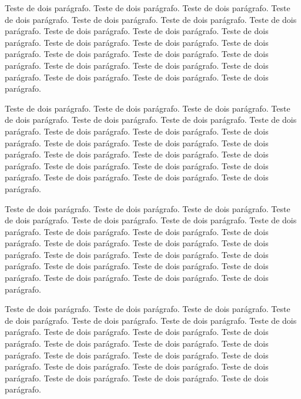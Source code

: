 \documentclass[12pt]{article}
\begin{document}

Teste de dois parágrafo. Teste de dois parágrafo. Teste de dois parágrafo. Teste de dois parágrafo. Teste de dois parágrafo. Teste de dois parágrafo. Teste de dois parágrafo. Teste de dois parágrafo. Teste de dois parágrafo. Teste de dois parágrafo. Teste de dois parágrafo. Teste de dois parágrafo. Teste de dois parágrafo. Teste de dois parágrafo. Teste de dois parágrafo. Teste de dois parágrafo. Teste de dois parágrafo. Teste de dois parágrafo. Teste de dois parágrafo. Teste de dois parágrafo. Teste de dois parágrafo. Teste de dois parágrafo.

Teste de dois parágrafo. Teste de dois parágrafo. Teste de dois parágrafo. Teste de dois parágrafo. Teste de dois parágrafo. Teste de dois parágrafo. Teste de dois parágrafo. Teste de dois parágrafo. Teste de dois parágrafo. Teste de dois parágrafo. Teste de dois parágrafo. Teste de dois parágrafo. Teste de dois parágrafo. Teste de dois parágrafo. Teste de dois parágrafo. Teste de dois parágrafo. Teste de dois parágrafo. Teste de dois parágrafo. Teste de dois parágrafo. Teste de dois parágrafo. Teste de dois parágrafo. Teste de dois parágrafo.


Teste de dois parágrafo. Teste de dois parágrafo. Teste de dois parágrafo. Teste de dois parágrafo. Teste de dois parágrafo. Teste de dois parágrafo. Teste de dois parágrafo. Teste de dois parágrafo. Teste de dois parágrafo. Teste de dois parágrafo. Teste de dois parágrafo. Teste de dois parágrafo. Teste de dois parágrafo. Teste de dois parágrafo. Teste de dois parágrafo. Teste de dois parágrafo. Teste de dois parágrafo. Teste de dois parágrafo. Teste de dois parágrafo. Teste de dois parágrafo. Teste de dois parágrafo. Teste de dois parágrafo.

Teste de dois parágrafo. Teste de dois parágrafo. Teste de dois parágrafo. Teste de dois parágrafo. Teste de dois parágrafo. Teste de dois parágrafo. Teste de dois parágrafo. Teste de dois parágrafo. Teste de dois parágrafo. Teste de dois parágrafo. Teste de dois parágrafo. Teste de dois parágrafo. Teste de dois parágrafo. Teste de dois parágrafo. Teste de dois parágrafo. Teste de dois parágrafo. Teste de dois parágrafo. Teste de dois parágrafo. Teste de dois parágrafo. Teste de dois parágrafo. Teste de dois parágrafo. Teste de dois parágrafo.
\end{document}
